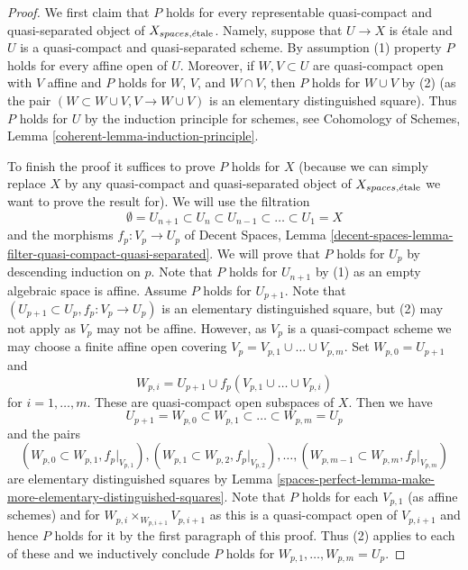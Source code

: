 \begin{proof}
We first claim that $P$ holds for every representable
quasi-compact and quasi-separated object of $X_{spaces, \acute{e}\text{tale}}$.
Namely, suppose that $U \to X$ is \'etale and $U$ is a
quasi-compact and quasi-separated scheme. By assumption (1)
property $P$ holds for every affine open of $U$. Moreover, if
$W, V \subset U$ are quasi-compact open with $V$ affine and $P$ holds for
$W$, $V$, and $W \cap V$, then $P$ holds for $W \cup V$ by (2)
(as the pair $(W \subset W \cup V, V \to W \cup V)$ is an elementary
distinguished square). Thus $P$ holds for $U$ by the induction
principle for schemes, see
Cohomology of Schemes, Lemma \ref{coherent-lemma-induction-principle}.

\medskip\noindent
To finish the proof it suffices to prove $P$ holds for $X$
(because we can simply replace $X$ by any quasi-compact and quasi-separated
object of $X_{spaces, \acute{e}\text{tale}}$ we want to prove the result for).
We will use the filtration
$$
\emptyset = U_{n + 1} \subset
U_n \subset U_{n - 1} \subset \ldots \subset U_1 = X
$$
and the morphisms $f_p : V_p \to U_p$ of
Decent Spaces, Lemma
\ref{decent-spaces-lemma-filter-quasi-compact-quasi-separated}.
We will prove that $P$ holds for $U_p$ by descending induction on $p$.
Note that $P$ holds for $U_{n + 1}$ by (1)
as an empty algebraic space is affine. Assume $P$ holds for $U_{p + 1}$.
Note that $(U_{p + 1} \subset U_p, f_p : V_p \to U_p)$ is an elementary
distinguished square, but (2) may not apply as $V_p$ may not be affine.
However, as $V_p$ is a quasi-compact scheme we may choose a finite affine open
covering $V_p = V_{p, 1} \cup \ldots \cup V_{p, m}$.
Set $W_{p, 0} = U_{p + 1}$ and
$$
W_{p, i} = U_{p + 1} \cup f_p(V_{p, 1} \cup \ldots \cup V_{p, i})
$$
for $i = 1, \ldots, m$. These are quasi-compact open subspaces of $X$.
Then we have
$$
U_{p + 1} = W_{p, 0} \subset
W_{p, 1} \subset \ldots \subset
W_{p, m} = U_p
$$
and the pairs
$$
(W_{p, 0} \subset W_{p, 1}, f_p|_{V_{p, 1}}),
(W_{p, 1} \subset W_{p, 2}, f_p|_{V_{p, 2}}),\ldots,
(W_{p, m - 1} \subset W_{p, m}, f_p|_{V_{p, m}})
$$
are elementary distinguished squares by
Lemma \ref{spaces-perfect-lemma-make-more-elementary-distinguished-squares}.
Note that $P$ holds for each $V_{p, 1}$ (as affine schemes) and for
$W_{p, i} \times_{W_{p, i + 1}} V_{p, i + 1}$ as this is a quasi-compact
open of $V_{p, i + 1}$ and hence $P$ holds for it by the first paragraph
of this proof. Thus (2) applies to each of these and we inductively
conclude $P$ holds for $W_{p, 1}, \ldots, W_{p, m} = U_p$.
\end{proof}

